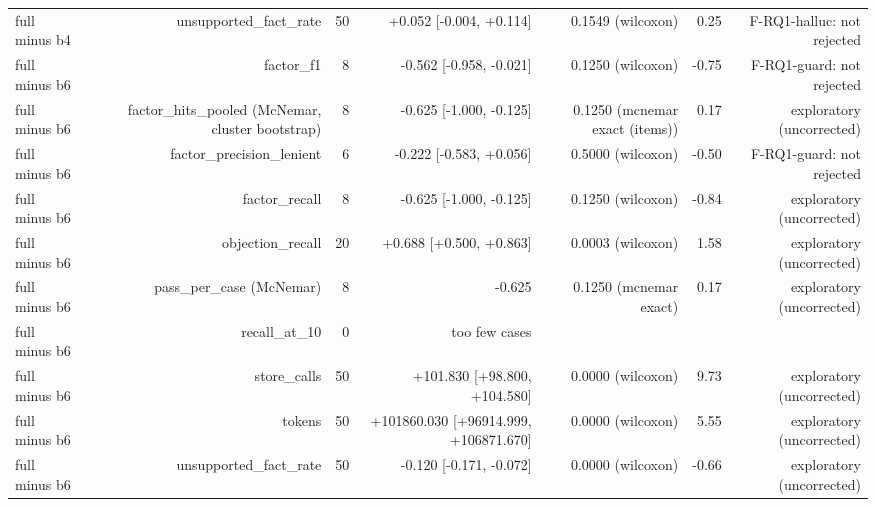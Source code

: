 \begin{table}[t]
\begin{adjustbox}{max width=\textwidth}
\begin{tabular}{lrrrrrr}
full minus b4 & unsupported\_fact\_rate & 50 & +0.052 [-0.004, +0.114] & 0.1549 (wilcoxon) & 0.25 & F-RQ1-halluc: not rejected \\
full minus b6 & factor\_f1 & 8 & -0.562 [-0.958, -0.021] & 0.1250 (wilcoxon) & -0.75 & F-RQ1-guard: not rejected \\
full minus b6 & factor\_hits\_pooled (McNemar, cluster bootstrap) & 8 & -0.625 [-1.000, -0.125] & 0.1250 (mcnemar exact (items)) & 0.17 & exploratory (uncorrected) \\
full minus b6 & factor\_precision\_lenient & 6 & -0.222 [-0.583, +0.056] & 0.5000 (wilcoxon) & -0.50 & F-RQ1-guard: not rejected \\
full minus b6 & factor\_recall & 8 & -0.625 [-1.000, -0.125] & 0.1250 (wilcoxon) & -0.84 & exploratory (uncorrected) \\
full minus b6 & objection\_recall & 20 & +0.688 [+0.500, +0.863] & 0.0003 (wilcoxon) & 1.58 & exploratory (uncorrected) \\
full minus b6 & pass\_per\_case (McNemar) & 8 & -0.625 & 0.1250 (mcnemar exact) & 0.17 & exploratory (uncorrected) \\
full minus b6 & recall\_at\_10 & 0 & too few cases &  &  &  \\
full minus b6 & store\_calls & 50 & +101.830 [+98.800, +104.580] & 0.0000 (wilcoxon) & 9.73 & exploratory (uncorrected) \\
full minus b6 & tokens & 50 & +101860.030 [+96914.999, +106871.670] & 0.0000 (wilcoxon) & 5.55 & exploratory (uncorrected) \\
full minus b6 & unsupported\_fact\_rate & 50 & -0.120 [-0.171, -0.072] & 0.0000 (wilcoxon) & -0.66 & exploratory (uncorrected) \\
\bottomrule
\end{tabular}
\end{adjustbox}
\end{table}
